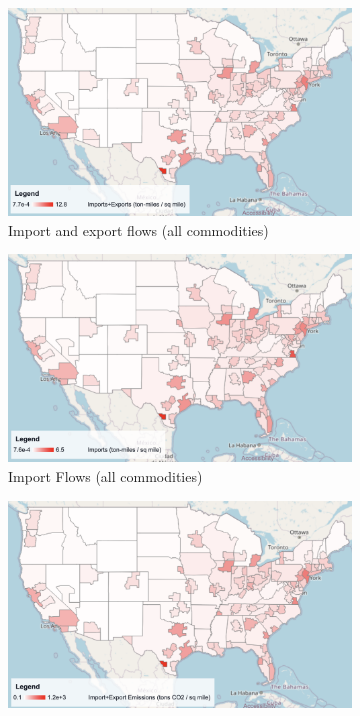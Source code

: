 \begin{figure}[ht]
    \centering
    \begin{subfigure}[b]{0.49\textwidth}
        \centering
        \includegraphics[width=\textwidth]{figures/imports_exports.png}
        \caption{Import and export flows (all commodities)}
        \label{fig:imports_exports}
    \end{subfigure}
    \hfill
    \begin{subfigure}[b]{0.49\textwidth}
        \centering
        \includegraphics[width=\textwidth]{figures/imports.png}
        \caption{Import Flows (all commodities)}
        \label{fig:imports}
    \end{subfigure}
    \begin{subfigure}[b]{0.49\textwidth}
        \centering
        \includegraphics[width=\textwidth]{figures/import_export_emissions.png}

\end{subfigure}
\end{figure}
